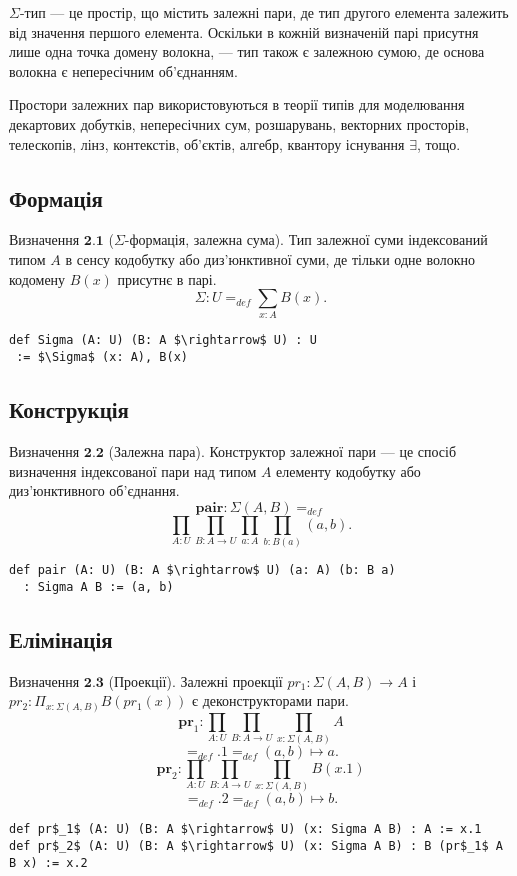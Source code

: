 \documentclass{article}
\theoremstyle{definition}
\begin{document}
$\Sigma$-тип --- це простір, що містить залежні пари, де тип другого
елемента залежить від значення першого елемента. Оскільки в кожній
визначеній парі присутня лише одна точка домену волокна, — тип також
є залежною сумою, де основа волокна є непересічним об'єднанням.

Простори залежних пар використовуються в теорії типів для моделювання
декартових добутків, непересічних сум, розшарувань, векторних просторів,
телескопів, лінз, контекстів, об'єктів, алгебр, квантору існування $\exists$, тощо.

\subsection{Формація}

$\textbf{Визначення\ 2.1}$ ($\Sigma$-формація, залежна сума). Тип залежної суми
індексований типом  $A$ в сенсу кодобутку або диз'юнктивної суми, де тільки одне
волокно кодомену $B(x)$ присутнє в парі.
$$
     \Sigma : U =_{def} \sum_{x:A} B(x).
$$
\begin{lstlisting}[mathescape=true]
def Sigma (A: U) (B: A $\rightarrow$ U) : U
 := $\Sigma$ (x: A), B(x)
\end{lstlisting}

\subsection{Конструкція}

$\textbf{Визначення\ 2.2}$ (Залежна пара). Конструктор залежної пари —
це спосіб визначення індексованої пари над типом $A$ елементу кодобутку
або диз'юнктивного об'єднання.
$$
      \mathbf{pair} : \Sigma(A,B) =_{def}
$$
$$
      \prod_{A:U}\prod_{B:A \rightarrow U}\prod_{a:A}\prod_{b:B(a)} (a,b).
$$
\begin{lstlisting}[mathescape=true]
def pair (A: U) (B: A $\rightarrow$ U) (a: A) (b: B a)
  : Sigma A B := (a, b)
\end{lstlisting}

\newpage

\subsection{Елімінація}

$\textbf{Визначення\ 2.3}$ (Проекції). Залежні проекції
$pr_{1}: \Sigma(A,B) \rightarrow A$ і
$pr_{2}: \Pi_{x: \Sigma(A,B)} B(pr_{1}(x))$ є деконструкторами пари.
$$
    \mathbf{pr}_1 : \prod_{A:U} \prod_{B:A \rightarrow U} \prod_{x: \Sigma(A,B)} A
$$
$$
    =_{def} .1 =_{def} (a,b) \mapsto a.
$$
$$
    \mathbf{pr}_2 : \prod_{A:U} \prod_{B:A \rightarrow U} \prod_{x: \Sigma(A,B)} B(x.1)
$$
$$
    =_{def} .2 =_{def} (a,b) \mapsto b.
$$
\begin{lstlisting}[mathescape=true]
def pr$_1$ (A: U) (B: A $\rightarrow$ U) (x: Sigma A B) : A := x.1
def pr$_2$ (A: U) (B: A $\rightarrow$ U) (x: Sigma A B) : B (pr$_1$ A B x) := x.2
\end{lstlisting}
\end{document}

